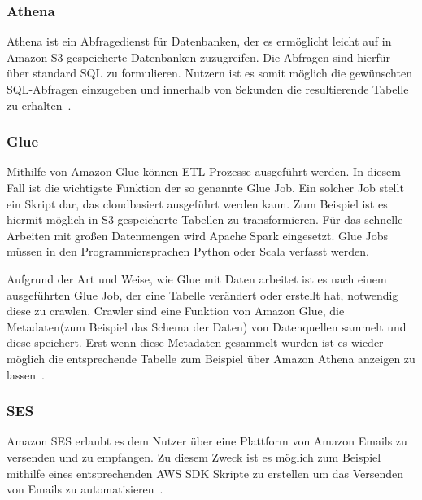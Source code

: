 \subsubsection{Athena}
Athena ist ein Abfragedienst für Datenbanken, der es ermöglicht leicht auf in Amazon \ac{S3} gespeicherte Datenbanken zuzugreifen. Die Abfragen sind hierfür über standard \ac{SQL} zu formulieren. Nutzern ist es somit möglich die gewünschten \ac{SQL}-Abfragen einzugeben und innerhalb von Sekunden die resultierende Tabelle zu erhalten~\cite{Amazon.c}.
\subsubsection{Glue}
Mithilfe von Amazon Glue können \ac{ETL} Prozesse ausgeführt werden. In diesem Fall ist die wichtigste Funktion der so genannte Glue Job. Ein solcher Job stellt ein Skript dar, das cloudbasiert ausgeführt werden kann. Zum Beispiel ist es hiermit möglich in \ac{S3} gespeicherte Tabellen zu transformieren. Für das schnelle Arbeiten mit großen Datenmengen wird Apache Spark eingesetzt. Glue Jobs müssen in den Programmiersprachen Python oder Scala verfasst werden.
\newline


Aufgrund der Art und Weise, wie Glue mit Daten arbeitet ist es nach einem ausgeführten Glue Job, der eine Tabelle verändert oder erstellt hat, notwendig diese zu crawlen. Crawler sind eine Funktion von Amazon Glue, die Metadaten(zum Beispiel das Schema der Daten) von Datenquellen sammelt und diese speichert. Erst wenn diese Metadaten gesammelt wurden ist es wieder möglich die entsprechende Tabelle zum Beispiel über Amazon Athena anzeigen zu lassen~\cite{Amazon.d}. 
\subsubsection{\ac{SES}}
Amazon \ac{SES} erlaubt es dem Nutzer über eine Plattform von Amazon Emails zu versenden und zu empfangen. Zu diesem Zweck ist es möglich zum Beispiel mithilfe eines entsprechenden \ac{AWS} \ac{SDK}  Skripte zu erstellen um das Versenden von Emails zu automatisieren~\cite{Amazon.e}.

